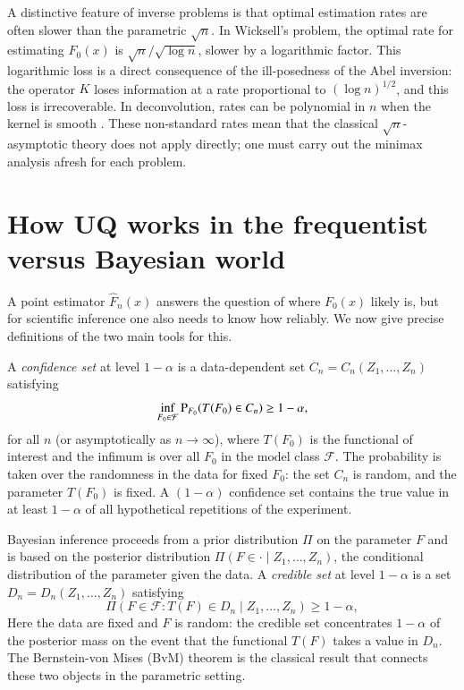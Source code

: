A distinctive feature of inverse problems is that optimal estimation rates are often slower than the parametric $\sqrt{n}$. In Wicksell's problem, the optimal rate for estimating $F_0(x)$ is $\sqrt{n}/\sqrt{\log n}$, slower by a logarithmic factor. This logarithmic loss is a direct consequence of the ill-posedness of the Abel inversion: the operator $K$ loses information at a rate proportional to $(\log n)^{1/2}$, and this loss is irrecoverable. In deconvolution, rates can be polynomial in $n$ when the kernel is smooth \cite{84}. These non-standard rates mean that the classical $\sqrt{n}$-asymptotic theory does not apply directly; one must carry out the minimax analysis afresh for each problem.



\section[Uncertainty quantification and BvM theorem]{How UQ works in the frequentist versus Bayesian world}\label{sec: UQ intro}
A point estimator $\hat{F}_n(x)$ answers the question of where $F_0(x)$ likely is, but for scientific inference one also needs to know how reliably. We now give precise definitions of the two main tools for this.

A \textit{confidence set} at level $1-\alpha$ is a data-dependent set $C_n = C_n(Z_1,\ldots,Z_n)$ satisfying
\[
\inf_{F_0 \in \mathcal{F}} \mathrm{P}_{F_0}\!\left(T(F_0) \in C_n\right) \geq 1-\alpha,
\]
for all $n$ (or asymptotically as $n\to\infty$), where $T(F_0)$ is the functional of interest and the infimum is over all $F_0$ in the model class $\mathcal{F}$. The probability is taken over the randomness in the data for fixed $F_0$: the set $C_n$ is random, and the parameter $T(F_0)$ is fixed. A $(1-\alpha)$ confidence set contains the true value in at least $1-\alpha$ of all hypothetical repetitions of the experiment.

Bayesian inference proceeds from a prior distribution $\Pi$ on the parameter $F$ and is based on the posterior distribution $\Pi\!\left(F \in \cdot \mid Z_1,\ldots,Z_n\right)$, the conditional distribution of the parameter given the data. A \textit{credible set} at level $1-\alpha$ is a set $D_n = D_n(Z_1,\ldots,Z_n)$ satisfying
\[
\Pi\!\left(F \in \mathcal{F} : T(F) \in D_n \mid Z_1,\ldots,Z_n\right) \geq 1-\alpha,
\]
Here the data are fixed and $F$ is random: the credible set concentrates $1-\alpha$ of the posterior mass on the event that the functional $T(F)$ takes a value in $D_n$. The Bernstein-von Mises (BvM) theorem is the classical result that connects these two objects in the parametric setting.

